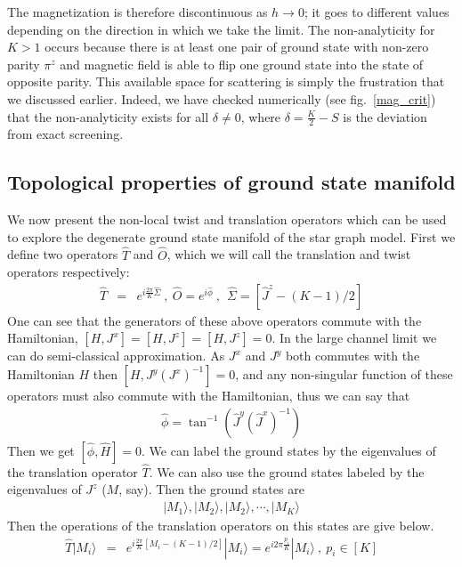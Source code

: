 \documentclass[reprint,prb,superscriptaddress]{revtex4-2}
\begin{document}
The magnetization is therefore discontinuous as \(h\to 0\); it goes to different values depending on the direction in which we take the limit. The non-analyticity for \(K>1\) occurs because there is at least one pair of ground state with non-zero parity \(\pi^z\) and magnetic field is able to flip one ground state into the state of opposite parity. This available space for scattering is simply the frustration that we discussed earlier. Indeed, we have checked numerically (see fig.~\ref{mag_crit}) that the non-analyticity exists for all \(\delta \neq 0\), where \(\delta = \frac{K}{2} - S\) is the deviation from exact screening. 

\subsection{Topological properties of ground state manifold}
\label{sec:topo_ground_state}
\noindent We now present the non-local twist and translation operators which can be used to explore the degenerate ground state manifold of the star graph model.
First we define two operators $\hat{T}$ and $\hat{O}$, which we will call the translation and twist operators respectively: 
\begin{eqnarray}
\hat{T} &=& e^{i\frac{2\pi}{K} \hat{\Sigma}} ~,~\hat{O} = e^{i\hat{\phi}}~,~~\hat{\Sigma}=[\hat{J}^z-(K-1)/2]
\end{eqnarray}
One can see that the generators of these above operators commute with the Hamiltonian, $[H,J^x]=[H,J^z]=[H,J^z]=0$. In the large channel limit we can do semi-classical approximation. As $J^x$ and $J^y$ both commutes with the Hamiltonian $H$ then $[H,J^y{(J^{x})}^{-1}]=0$, and any non-singular function of these operators must also commute with the Hamiltonian, thus we can say that
\begin{eqnarray}
\hat{\phi}=\tan^{-1}(\hat{J}^y(\hat{J}^x)^{-1})
\end{eqnarray}
Then we get $[\hat{\phi},\hat{H}]=0$. We can label the ground states by the eigenvalues of the translation operator $\hat{T}$. We can also use the ground states labeled by the eigenvalues of $J^z$ ($M$, say). Then the ground states are 
\begin{eqnarray}
|M_1\rangle,|M_2\rangle,|M_2\rangle,\cdots ,|M_K\rangle
\end{eqnarray}
Then the operations of the translation operators on this states are give below.
\begin{eqnarray}
\hat{T}|M_i\rangle &=& e^{i\frac{2\pi}{K} [M_i-(K-1)/2]} |M_i\rangle = e^{i2\pi\frac{p_i}{K} } |M_i\rangle~,~p_i\in[K]~~~~~~~
\end{eqnarray}
\end{document}
